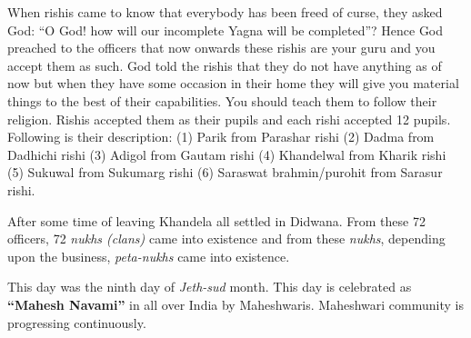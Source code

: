 When rishis came to know that everybody has been freed of curse, they asked God: ``O God! how will our incomplete Yagna will be completed''? Hence God preached to the officers that now onwards these rishis are your guru and you accept them as such. God told the rishis that they do not have anything as of now but when they have some occasion in their home they will give you material things to the best of their capabilities. You should teach them to follow their religion. Rishis accepted them as their pupils and each rishi accepted 12 pupils. Following is their description: 
(1) Parik from Parashar rishi (2) Dadma from Dadhichi rishi (3) Adigol from Gautam rishi (4) Khandelwal from Kharik rishi (5) Sukuwal from Sukumarg rishi (6) Saraswat brahmin/purohit from Sarasur rishi.

After some time of leaving Khandela all settled in Didwana. From these 72 officers, 72 \textit{nukhs (clans)} came into existence and from these \textit{nukhs}, depending upon the business, \textit{peta-nukhs} came into existence.

This day was the ninth day of \textit{Jeth-sud} month. This day is celebrated as \textbf{``Mahesh Navami''} in all over India by Maheshwaris. Maheshwari community is progressing continuously.
